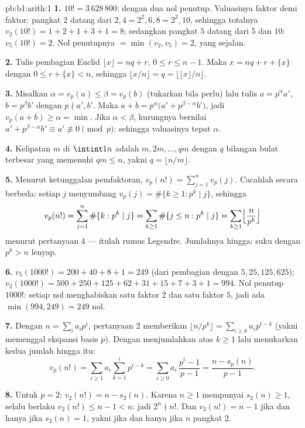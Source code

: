 \begin{solution}{pb:b1:arith:1}
\textbf{1.} $10! = 3\,628\,800$: dengan dua nol penutup. Valuasinya
faktor demi faktor: pangkat $2$ datang dari $2, 4 = 2^2, 6, 8 = 2^3,
10$, sehingga totalnya $v_2(10!) = 1 + 2 + 1 + 3 + 1 = 8$; sedangkan pangkat $5$
datang dari $5$ dan $10$: $v_5(10!) = 2$. Nol penutupnya $=
\min(v_2, v_5) = 2$, yang sejalan.

\textbf{2.} Tulis pembagian Euclid $\lfloor x\rfloor = nq +
r$, $0 \leq r \leq n - 1$. Maka $x = nq + r + \{x\}$ dengan $0 \leq
r + \{x\} < n$, sehingga $\lfloor x/n \rfloor = q = \bigl\lfloor \lfloor
x \rfloor / n \bigr\rfloor$.

\textbf{3.} Misalkan $\alpha = v_p(a) \leq \beta = v_p(b)$ (tukarkan bila
perlu) lalu tulis $a = p^\alpha a'$, $b = p^\beta b'$ dengan $p
\nmid a', b'$. Maka $a + b = p^\alpha\bigl(a' + p^{\beta -
\alpha}b'\bigr)$, jadi $v_p(a + b) \geq \alpha = \min$. Jika $\alpha <
\beta$, kurungnya bernilai $a' + p^{\beta-\alpha}b' \equiv a'
\not\equiv 0 \pmod p$: sehingga valuasinya tepat $\alpha$.

\textbf{4.} Kelipatan $m$ di $\intint1n$ adalah $m, 2m, \dots,
qm$ dengan $q$ bilangan bulat terbesar yang memenuhi $qm \leq n$, yakni $q =
\lfloor n/m \rfloor$.

\textbf{5.} Menurut ketunggalan pemfaktoran, $v_p(n!) = \sum_{j=1}^{n}
v_p(j)$. Cacahlah secara berbeda: setiap $j$ menyumbang $v_p(j) =
\#\{k \geq 1 : p^k \mid j\}$, sehingga
\[
v_p(n!) = \sum_{j=1}^n \#\{k : p^k \mid j\}
= \sum_{k\geq1} \#\{j \leq n : p^k \mid j\}
= \sum_{k\geq1} \Bigl\lfloor \frac n{p^k} \Bigr\rfloor
\]
menurut pertanyaan 4 --- itulah rumus Legendre. Jumlahnya hingga: suku
dengan $p^k > n$ lenyap.

\textbf{6.} $v_5(1000!) = 200 + 40 + 8 + 1 = 249$ (dari pembagian dengan
$5, 25, 125, 625$); $v_2(1000!) = 500 + 250 + 125 + 62 + 31 + 15 +
7 + 3 + 1 = 994$. Nol penutup $1000!$: setiap nol menghabiskan
satu faktor $2$ dan satu faktor $5$, jadi ada $\min(994, 249) = 249$ nol.

\textbf{7.} Dengan $n = \sum_i a_ip^i$, pertanyaan 2 memberikan $\lfloor
n/p^k \rfloor = \sum_{i \geq k} a_ip^{i-k}$ (yakni memenggal ekspansi
basis $p$). Dengan menjumlahkan atas $k \geq 1$ lalu menukarkan kedua
jumlah hingga itu:
\[
v_p(n!) = \sum_{i\geq1} a_i \sum_{k=1}^{i} p^{i-k}
= \sum_{i\geq0} a_i\,\frac{p^i - 1}{p - 1}
= \frac{n - s_p(n)}{p - 1} .
\]

\textbf{8.} Untuk $p = 2$: $v_2(n!) = n - s_2(n)$. Karena $n \geq 1$
mempunyai $s_2(n) \geq 1$, selalu berlaku $v_2(n!) \leq n - 1 < n$: jadi $2^n \nmid
n!$. Dan $v_2(n!) = n - 1$ jika dan hanya jika $s_2(n) = 1$, yakni jika dan hanya jika $n$ pangkat
$2$.


\end{solution}
